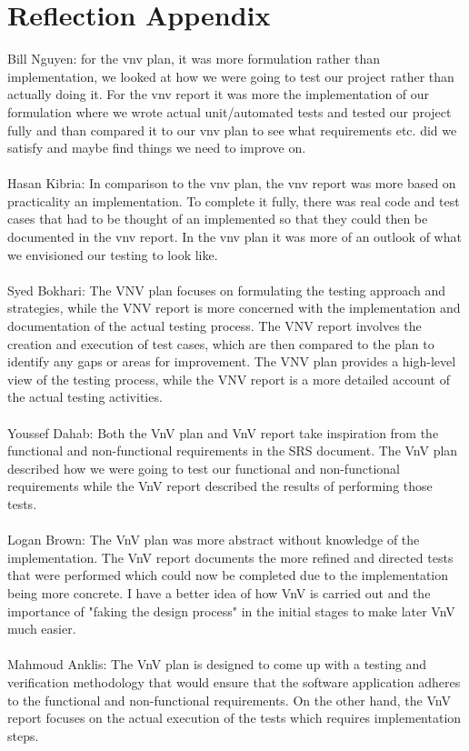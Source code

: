 \documentclass[12pt, titlepage]{article}
\begin{document}
\section{Reflection Appendix}
Bill Nguyen: for the vnv plan, it was more formulation rather than implementation, we looked at how we were going to test our project rather than actually doing it. For the vnv report it was more the implementation of our formulation where we wrote actual unit/automated tests and tested our project fully and than compared it to our vnv plan to see what requirements etc. did we satisfy and maybe find things we need to improve on.\\\\
Hasan Kibria: In comparison to the vnv plan, the vnv report was more based on practicality an implementation. To complete it fully, there was real code and test cases that had to be thought of an implemented so that they could then be documented in the vnv report. In the vnv plan it was more of an outlook of what we envisioned our testing to look like.\\\\
Syed Bokhari: The VNV plan focuses on formulating the testing approach and strategies, while the VNV report is more concerned with the implementation and documentation of the actual testing process. The VNV report involves the creation and execution of test cases, which are then compared to the plan to identify any gaps or areas for improvement. The VNV plan provides a high-level view of the testing process, while the VNV report is a more detailed account of the actual testing activities.\\\\
Youssef Dahab: Both the VnV plan and VnV report take inspiration from the functional and non-functional requirements in the SRS document. The VnV plan described how we were going to test our functional and non-functional requirements while the VnV report described the results of performing those tests.\\\\
Logan Brown: The VnV plan was more abstract without knowledge of the implementation. The VnV report documents the more refined and directed tests that were performed which could now be completed due to the implementation being more concrete. I have a better idea of how VnV is carried out and the importance of "faking the design process" in the initial stages to make later VnV much easier.\\\\
Mahmoud Anklis: The VnV plan is designed to come up with a testing and verification methodology that would ensure that the software application adheres to the functional and non-functional requirements. On the other hand, the VnV report focuses on the actual execution of the tests which requires implementation steps.\\\\




\end{document}
